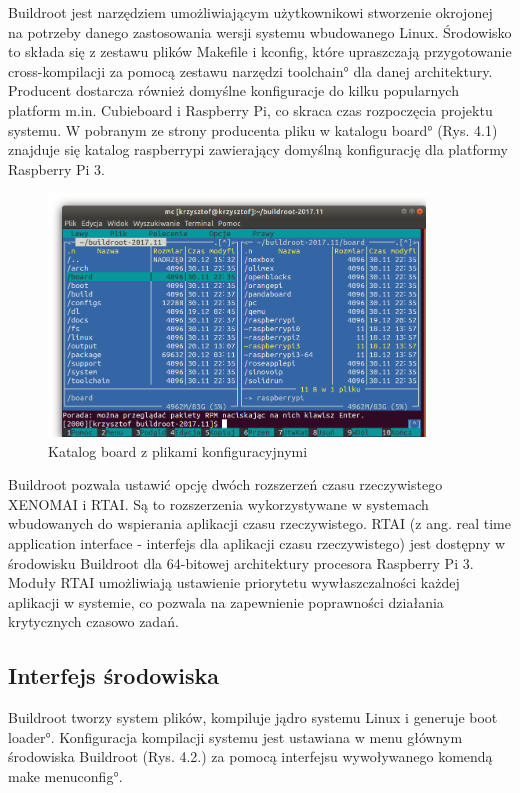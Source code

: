 Buildroot jest narzędziem umożliwiającym użytkownikowi stworzenie okrojonej na potrzeby danego zastosowania wersji systemu wbudowanego Linux. Środowisko to składa się z zestawu plików Makefile i kconfig, które upraszczają przygotowanie cross-kompilacji za pomocą zestawu narzędzi \ang{toolchain} dla danej architektury. Producent dostarcza również domyślne konfiguracje do kilku popularnych platform m.in. Cubieboard i Raspberry Pi, co skraca czas rozpoczęcia projektu systemu. W pobranym ze strony producenta pliku w katalogu \ang{board} (Rys. 4.1) znajduje się katalog raspberrypi zawierający domyślną konfigurację dla platformy Raspberry Pi 3.
\begin{figure}[h]
	\centering
		\includegraphics[width=10cm]{buildroot_katalogi}
	\caption{Katalog board z plikami konfiguracyjnymi} 
	\label{fig:uxtouch}
\end{figure}

Buildroot pozwala ustawić opcję dwóch rozszerzeń czasu rzeczywistego XENOMAI i RTAI. Są to rozszerzenia wykorzystywane w systemach wbudowanych do wspierania aplikacji czasu rzeczywistego.
RTAI (z ang. real time application interface - interfejs dla aplikacji czasu rzeczywistego) jest dostępny w środowisku Buildroot dla 64-bitowej architektury procesora Raspberry Pi 3. Moduły RTAI umożliwiają ustawienie priorytetu wywłaszczalności każdej aplikacji w systemie, co pozwala na zapewnienie poprawności działania krytycznych czasowo zadań.


\subsection{Interfejs środowiska}
Buildroot tworzy system plików, kompiluje jądro systemu Linux i generuje \ang{boot loader}. Konfiguracja kompilacji systemu jest ustawiana w menu głównym środowiska Buildroot (Rys. 4.2.) za pomocą interfejsu wywoływanego komendą \ang{make menuconfig}.


